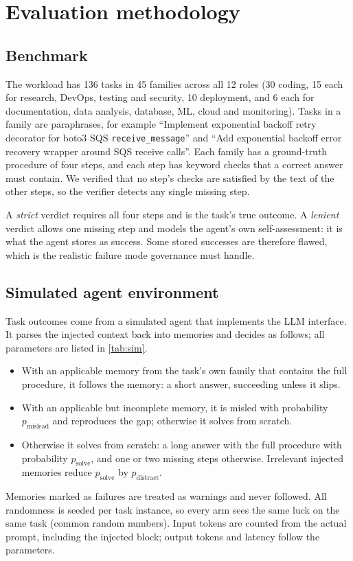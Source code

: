 \documentclass[5p,times,twocolumn]{elsarticle}
\begin{document}
\section{Evaluation methodology}
\label{sec:method}

\subsection{Benchmark}
The workload has 136 tasks in 45 families across all 12 roles (30 coding, 15 each for research, DevOps, testing and security, 10 deployment, and 6 each for documentation, data analysis, database, ML, cloud and monitoring). Tasks in a family are paraphrases, for example ``Implement exponential backoff retry decorator for boto3 SQS \texttt{receive\_message}'' and ``Add exponential backoff error recovery wrapper around SQS receive calls''. Each family has a ground-truth procedure of four steps, and each step has keyword checks that a correct answer must contain. We verified that no step's checks are satisfied by the text of the other steps, so the verifier detects any single missing step.

A \emph{strict} verdict requires all four steps and is the task's true outcome. A \emph{lenient} verdict allows one missing step and models the agent's own self-assessment: it is what the agent stores as success. Some stored successes are therefore flawed, which is the realistic failure mode governance must handle.

\subsection{Simulated agent environment}
\label{sec:sim}
Task outcomes come from a simulated agent that implements the LLM interface. It parses the injected context back into memories and decides as follows; all parameters are listed in \cref{tab:sim}.
\begin{itemize}
\item With an applicable memory from the task's own family that contains the full procedure, it follows the memory: a short answer, succeeding unless it slips.
\item With an applicable but incomplete memory, it is misled with probability $p_{\mathrm{mislead}}$ and reproduces the gap; otherwise it solves from scratch.
\item Otherwise it solves from scratch: a long answer with the full procedure with probability $p_{\mathrm{solve}}$, and one or two missing steps otherwise. Irrelevant injected memories reduce $p_{\mathrm{solve}}$ by $p_{\mathrm{distract}}$.
\end{itemize}
Memories marked as failures are treated as warnings and never followed. All randomness is seeded per task instance, so every arm sees the same luck on the same task (common random numbers). Input tokens are counted from the actual prompt, including the injected block; output tokens and latency follow the parameters.
\end{document}
